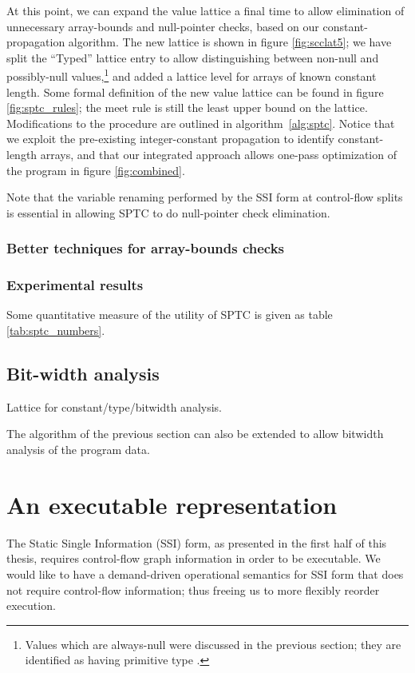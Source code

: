 \documentclass[12pt,titlepage,twoside]{article}
\newcommand*{\figscale}{1.0}
\let\oldsection\section
\renewcommand{\section}{\setcounter{figure}{0}\setcounter{table}{0}\oldsection}
\begin{document}
At this point, we can expand the value lattice a final time to allow
elimination of unnecessary array-bounds and null-pointer checks, based
on our constant-propagation algorithm.  The new lattice is shown in
figure \ref{fig:scclat5}; we have split the ``Typed'' lattice entry to
allow distinguishing between non-null and possibly-null
values,\footnote{Values which are always-null were discussed in the
previous section; they are identified as having primitive type .}
and added a lattice level for arrays of known constant length.  
Some formal definition of the new value lattice can be found in
figure \ref{fig:sptc_rules}; the meet rule is still the least upper
bound on the lattice.  Modifications to the  procedure are
outlined in algorithm~\ref{alg:sptc}.
Notice that we exploit the pre-existing integer-constant propagation to
identify constant-length arrays, and that our integrated approach
allows one-pass optimization of the program in figure \ref{fig:combined}.

Note that the variable renaming performed by the SSI form at
control-flow splits is essential in allowing SPTC to do 
null-pointer check elimination.

\subsubsection{Better techniques for array-bounds checks}

\subsubsection{Experimental results}\label{sec:sptc_results}
Some quantitative measure of the
utility of SPTC is given as table \ref{tab:sptc_numbers}.

\subsection{Bit-width analysis}\label{sec:bitwidth}
\begin{myfigure}[t]
\centering\renewcommand*{\figscale}{0.6}
\caption{Lattice for constant/type/bitwidth analysis.}
\label{fig:lattice}
\end{myfigure}
The algorithm of the previous section
can also be extended to allow bitwidth analysis of the program data.%

\section{An executable representation}\label{sec:ssiplus}
The Static Single Information (SSI) form, as presented in the first
half of this thesis,
requires control-flow graph information in order to be executable. We
would like to have a demand-driven operational semantics for SSI form
that does not require control-flow information; thus freeing us to
more flexibly reorder execution.
\end{document}

